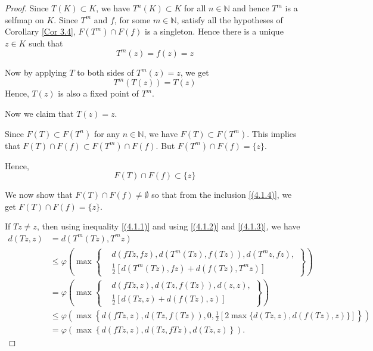 \documentclass[a4paper,12pt,oneside]{article}
\numberwithin{equation}{section}
\begin{document}
\begin{proof}
    Since \(T(K) \subset K\), we have \(T^{n}(K) \subset K\) for all \(n \in \mathbb{N}\) and hence \(T^{m}\) is a selfmap on \(K\). Since \(T^{m}\) and \(f\), for some \(m \in \mathbb{N}\), satisfy all the hypotheses of Corollary \eqref{Cor 3.4}, \(F(T^{m}) \cap F(f)\) is a singleton. Hence there is a unique \(z \in K\) such that
\begin{equation} \label{(4.1.2)}
T^{m}(z) = f(z) = z
\end{equation}

Now by applying \(T\) to both sides of \(T^{m}(z) = z\), we get
\begin{equation} \label{(4.1.3)}
T^{m}(T(z)) = T(z)
\end{equation}
Hence, \(T(z)\) is also a fixed point of \(T^{m}\).

Now we claim that \(T(z) = z\).

Since \(F(T) \subset F(T^{n})\) for any \(n \in \mathbb{N}\), we have \(F(T) \subset F(T^{m})\). This implies that \(F(T) \cap F(f) \subset F(T^{m}) \cap F(f)\). But \(F(T^{m}) \cap F(f) = \{z\}\).

Hence,
\begin{equation} \label{(4.1.4)}
F(T) \cap F(f) \subset \{z\}
\end{equation}

We now show that \(F(T) \cap F(f) \neq \emptyset\) so that from the inclusion \eqref{(4.1.4)}, we get \(F(T) \cap F(f) = \{z\}\).

If \(Tz \neq z\), then using inequality \eqref{(4.1.1)} and using \eqref{(4.1.2)} and \eqref{(4.1.3)}, we have
\begin{align*}
d(Tz, z) &= d(T^{m}(Tz), T^{m}z) \\
&\leq \varphi\left(\max\left\{
\begin{aligned}
&d(fTz, fz), d(T^{m}(Tz), f(Tz)), d(T^{m}z, fz), \\
&\frac{1}{2}[d(T^{m}(Tz), fz) + d(f(Tz), T^{m}z)]
\end{aligned}
\right\}\right) \\
&= \varphi\left(\max\left\{
\begin{aligned}
&d(fTz, z), d(Tz, f(Tz)), d(z, z), \\
&\frac{1}{2}[d(Tz, z) + d(f(Tz), z)]
\end{aligned}
\right\}\right) \\
&\leq \varphi\left(\max\left\{
d(fTz, z), d(Tz, f(Tz)), 0, \frac{1}{2}[2 \max \{d(Tz, z), d(f(Tz), z)\}]
\right\}\right) \\
&= \varphi\left(\max\left\{d(fTz, z), d(Tz, fTz),  d(Tz, z)\right\}\right).
\end{align*}


\end{proof}
\end{document}
